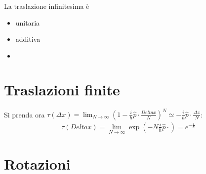 
La traslazione infinitesima è
\begin{itemize}
\item unitaria
\item additiva
\item 
\end{itemize}

\section{Traslazioni finite} %
Si prenda ora $\tau\left(\Delta x\right)=\lim_{N\to \infty }{\left(1-\frac{i}{\hbar }\hat p\cdot \frac{Delta x}{N}\right)^N}\simeq -\frac{i}{\hbar }\hat p\cdot \frac{\Delta x}{N}$:
\begin{equation}\begin{split}
\tau \left(Delta x\right)=\lim_{N\to \infty }{\exp{\left(-N\frac{i}{\hbar }\hat p\cdot \right)}}=e^{-\frac{i}{\hbar }}
\end{split}\end{equation}

\section{Rotazioni} %

